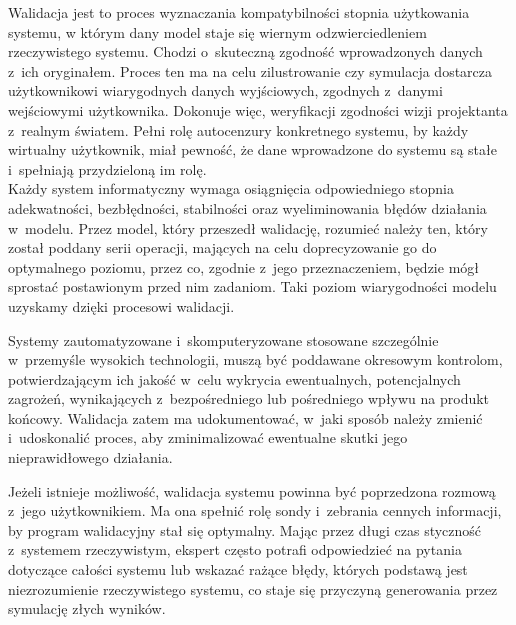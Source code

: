 \documentclass{xmgr}
\begin{document}
\indent \indent \indent Walidacja jest to proces wyznaczania kompatybilności stopnia użytkowania systemu, w którym dany model staje się wiernym odzwierciedleniem rzeczywistego systemu. Chodzi o~skuteczną zgodność wprowadzonych danych z~ich oryginałem. Proces ten ma na celu zilustrowanie czy symulacja dostarcza użytkownikowi wiarygodnych danych wyjściowych, zgodnych z~danymi wejściowymi użytkownika. Dokonuje więc, weryfikacji zgodności wizji projektanta z~realnym światem. Pełni rolę autocenzury konkretnego systemu, by każdy wirtualny użytkownik, miał pewność, że dane wprowadzone do systemu są stałe i~spełniają przydzieloną im rolę.
\\
\indent Każdy system informatyczny wymaga osiągnięcia odpowiedniego stopnia adekwatności, bezbłędności, stabilności oraz wyeliminowania błędów działania w~modelu. Przez model, który przeszedł walidację, rozumieć należy ten, który został poddany serii operacji, mających na celu doprecyzowanie go do optymalnego poziomu, przez co, zgodnie z~jego przeznaczeniem, będzie mógł sprostać postawionym przed nim zadaniom. Taki poziom wiarygodności modelu uzyskamy dzięki procesowi walidacji.

Systemy zautomatyzowane i~skomputeryzowane stosowane szczególnie w~przemyśle wysokich technologii, muszą być poddawane okresowym kontrolom, potwierdzającym ich jakość w~celu wykrycia ewentualnych, potencjalnych zagrożeń, wynikających z~bezpośredniego lub pośredniego wpływu na produkt końcowy. Walidacja zatem ma udokumentować, w~jaki sposób należy zmienić i~udoskonalić proces, aby zminimalizować ewentualne skutki jego nieprawidłowego działania.

Jeżeli istnieje możliwość, walidacja systemu powinna być poprzedzona rozmową z~jego użytkownikiem. Ma ona spełnić rolę sondy i~zebrania cennych informacji, by program walidacyjny stał się optymalny. Mając przez długi czas styczność z~systemem rzeczywistym, ekspert często potrafi odpowiedzieć na pytania dotyczące całości systemu lub wskazać rażące błędy, których podstawą jest niezrozumienie rzeczywistego systemu, co staje się przyczyną generowania przez symulację złych wyników. \cite{Validation}
\end{document}
